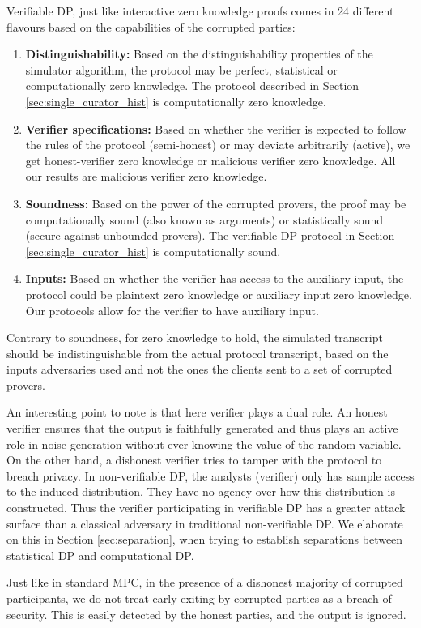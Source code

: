  Verifiable DP, just like interactive zero knowledge proofs \cite{goldreich_foundations_2007} comes in 24 different flavours based on the capabilities of the corrupted parties:
 
 \begin{enumerate}
 	\item{\textbf{Distinguishability:} Based on the distinguishability properties of the simulator algorithm, the protocol may be perfect, statistical or computationally zero knowledge. The protocol described in Section \ref{sec:single_curator_hist} is computationally zero knowledge. } 
 	\item{\textbf{Verifier specifications:} Based on whether the verifier is expected to follow the rules of the protocol (semi-honest) or may deviate arbitrarily (active), we get honest-verifier zero knowledge or malicious verifier zero knowledge. All our results are malicious verifier zero knowledge.}  	
 	\item{\textbf{Soundness:} Based on the power of the corrupted provers, the proof may be computationally sound (also known as arguments) or statistically sound (secure against unbounded provers). The verifiable DP protocol in Section \ref{sec:single_curator_hist} is computationally sound.}  	
 	\item{\textbf{Inputs:} Based on whether the verifier has access to the auxiliary input, the protocol could be plaintext zero knowledge or auxiliary input zero knowledge. Our protocols allow for the verifier to have auxiliary input.}  	 	
 \end{enumerate}

 
\begin{remark}
 Contrary to soundness, for zero knowledge to hold, the simulated transcript should be indistinguishable from the actual protocol transcript, based on the inputs adversaries used and not the ones the clients sent to a set of corrupted provers.	
\end{remark} 
 
 \begin{remark}
 An interesting point to note is that here verifier plays a dual role. An honest verifier ensures
 that the output is faithfully generated and thus plays an active role in noise generation without ever knowing the value of the random variable.	 On the other hand, a dishonest verifier tries to tamper with the protocol to breach privacy. 
  In non-verifiable DP, the analysts
 (verifier) only has sample access to the induced distribution. They have no agency over how this distribution is constructed. Thus the verifier
 participating in verifiable DP has a greater attack surface than a classical adversary in traditional non-verifiable DP. 
 We elaborate on this in Section \ref{sec:separation}, when trying to establish separations between statistical DP and computational DP.
 \end{remark}
 
 \begin{remark}
Just like in standard MPC, in the presence of a dishonest majority of corrupted participants, we do not treat early exiting by corrupted parties as a breach of security. This is easily detected by the honest parties, and the output is ignored. 	
 \end{remark}
 
